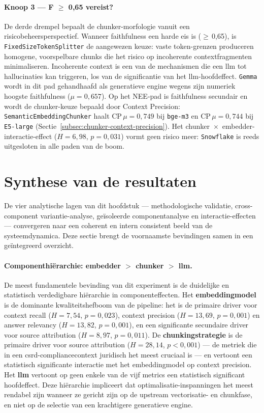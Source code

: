 \paragraph{Knoop 3 — F $\geq$ 0{,}65 vereist?}
De derde drempel bepaalt de chunker-morfologie vanuit een risicobeheersperspectief. Wanneer faithfulness een harde eis is ($\geq$\,0{,}65), is \texttt{FixedSizeTokenSplitter} de aangewezen keuze: vaste token-grenzen produceren homogene, voorspelbare chunks die het risico op incoherente contextfragmenten minimaliseren. Incoherente context is een van de mechanismen die een \gls{llm} tot hallucinaties kan triggeren, los van de significantie van het \gls{llm}-hoofdeffect. \texttt{Gemma} wordt in dit pad gehandhaafd als generatieve engine wegens zijn numeriek hoogste faithfulness ($\mu{=}0{,}657$). Op het NEE-pad is faithfulness secundair en wordt de chunker-keuze bepaald door Context Precision: \texttt{SemanticEmbeddingChunker} haalt CP\,$\mu{=}0{,}749$ bij \texttt{bge-m3} en CP\,$\mu{=}0{,}744$ bij \texttt{E5-large} (Sectie~\ref{subsec:chunker-context-precision}). Het chunker~$\times$~embedder-interactie-effect ($H{=}6{,}98$, $p{=}0{,}031$) vormt geen risico meer: \texttt{Snowflake} is reeds uitgesloten in alle paden van de boom.

\section{Synthese van de resultaten}
\label{sec:synthese}

De vier analytische lagen van dit hoofdstuk — methodologische validatie, cross-component variantie-analyse, geïsoleerde componentanalyse en interactie-effecten — convergeren naar een coherent en intern consistent beeld van de systeemdynamica. Deze sectie brengt de voornaamste bevindingen samen in een geïntegreerd overzicht.

\paragraph{Componenthiërarchie: embedder \texorpdfstring{$>$}{>} chunker \texorpdfstring{$>$}{>} \gls{llm}.}
De meest fundamentele bevinding van dit experiment is de duidelijke en statistisch verdedigbare hiërarchie in componenteffecten. Het \textbf{embeddingmodel} is de dominante kwaliteitshefboom van de pipeline: het is de primaire driver voor context recall ($H = 7{,}54$, $p = 0{,}023$), context precision ($H = 13{,}69$, $p = 0{,}001$) en answer relevancy ($H = 13{,}82$, $p = 0{,}001$), en een significante secundaire driver voor source attribution ($H = 8{,}97$, $p = 0{,}011$). De \textbf{chunkingstrategie} is de primaire driver voor source attribution ($H = 28{,}14$, $p < 0{,}001$) — de metriek die in een \gls{csrd}-compliancecontext juridisch het meest cruciaal is — en vertoont een statistisch significante interactie met het embeddingmodel op context precision. Het \textbf{\gls{llm}} vertoont op geen enkele van de vijf metrics een statistisch significant hoofdeffect. Deze hiërarchie impliceert dat optimalisatie-inspanningen het meest rendabel zijn wanneer ze gericht zijn op de upstream vectorisatie- en chunkfase, en niet op de selectie van een krachtigere generatieve engine.

